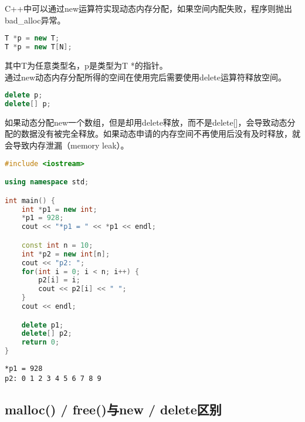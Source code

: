 C++中可以通过new运算符实现动态内存分配，如果空间内配失败，程序则抛出bad\_alloc异常。

\vspace{-0.5cm}

\begin{lstlisting}[language=C++]
T *p = new T;
T *p = new T[N];
\end{lstlisting}

其中T为任意类型名，p是类型为T *的指针。\\

通过new动态内存分配所得的空间在使用完后需要使用delete运算符释放空间。

\vspace{-0.5cm}

\begin{lstlisting}[language=C++]
delete p;
delete[] p;
\end{lstlisting}

如果动态分配new一个数组，但是却用delete释放，而不是delete[]，会导致动态分配的数据没有被完全释放。如果动态申请的内存空间不再使用后没有及时释放，就会导致内存泄漏（memory leak）。\\


\begin{lstlisting}[language=C++]
#include <iostream>

using namespace std;

int main() {
    int *p1 = new int;
    *p1 = 928;
    cout << "*p1 = " << *p1 << endl;

    const int n = 10;
    int *p2 = new int[n];
    cout << "p2: ";
    for(int i = 0; i < n; i++) {
        p2[i] = i;
        cout << p2[i] << " ";
    }
    cout << endl;

    delete p1;
    delete[] p2;
    return 0;
}
\end{lstlisting}

\begin{tcolorbox}
	\begin{verbatim}
*p1 = 928
p2: 0 1 2 3 4 5 6 7 8 9
	\end{verbatim}
\end{tcolorbox}

\vspace{0.5cm}

\subsection{malloc() / free()与new / delete区别}

